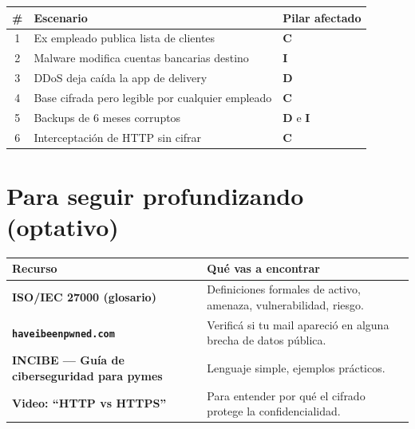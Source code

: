 \documentclass[12pt,a4paper]{article}
\begin{document}
\begin{table}[h!]
\centering
\renewcommand{\arraystretch}{1.5}
\begin{tabularx}{\textwidth}{|c|X|>{\centering\arraybackslash}p{3.5cm}|}
\hline
\textbf{\#} & \textbf{Escenario} & \textbf{Pilar afectado} \\
\hline
1 & Ex empleado publica lista de clientes & \textbf{C} \\
\hline
2 & Malware modifica cuentas bancarias destino & \textbf{I} \\
\hline
3 & DDoS deja caída la app de delivery & \textbf{D} \\
\hline
4 & Base cifrada pero legible por cualquier empleado & \textbf{C} \\
\hline
5 & Backups de 6 meses corruptos & \textbf{D} e \textbf{I} \\
\hline
6 & Interceptación de HTTP sin cifrar & \textbf{C} \\
\hline
\end{tabularx}
\end{table}

\section{Para seguir profundizando (optativo)}

\begin{table}[h!]
\centering
\renewcommand{\arraystretch}{1.4}
\begin{tabularx}{\textwidth}{>{\bfseries}p{5.5cm}X}
\toprule
Recurso & Qué vas a encontrar \\
\midrule
ISO/IEC 27000 (glosario) & Definiciones formales de activo, amenaza, vulnerabilidad, riesgo. \\
\texttt{haveibeenpwned.com} & Verificá si tu mail apareció en alguna brecha de datos pública. \\
INCIBE --- Guía de ciberseguridad para pymes & Lenguaje simple, ejemplos prácticos. \\
Video: ``HTTP vs HTTPS'' & Para entender por qué el cifrado protege la confidencialidad. \\
\bottomrule
\end{tabularx}
\end{table}

\end{document}
